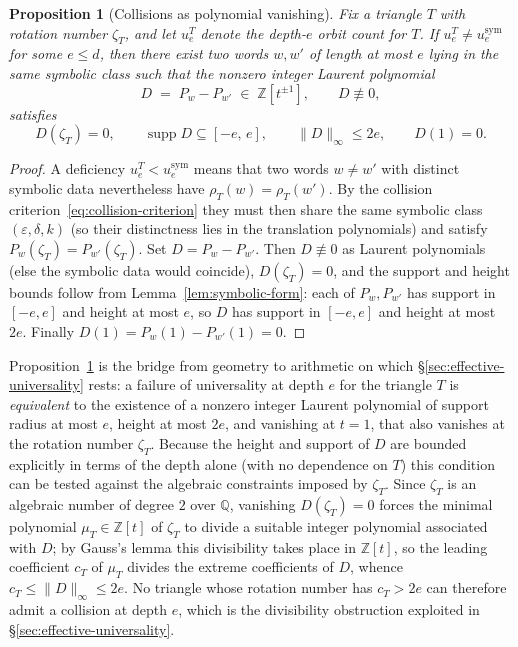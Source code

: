 \documentclass[11pt]{article}
\theoremstyle{plain}
\newtheorem{proposition}[theorem]{Proposition}
\theoremstyle{definition}
\theoremstyle{remark}
\begin{document}
\begin{proposition}[Collisions as polynomial vanishing]
\label{prop:collision-vanishing}
Fix a triangle $T$ with rotation number $\zeta_T$, and let
$u_e^T$ denote the depth-$e$ orbit count for $T$. If
$u_e^T \ne u_e^{\mathrm{sym}}$ for some $e \le d$, then there exist two
words $w, w'$ of length at most $e$ lying in the same symbolic class such
that the nonzero integer Laurent polynomial
\[
D \;=\; P_w - P_{w'} \;\in\; \mathbb{Z}[t^{\pm 1}],
\qquad D \not\equiv 0,
\]
satisfies
\begin{equation}
\label{eq:collision-vanishing-form}
D(\zeta_T) = 0,
\qquad
\operatorname{supp} D \subseteq [-e,\,e],
\qquad
\|D\|_\infty \le 2e,
\qquad
D(1) = 0.
\end{equation}
\end{proposition}

\begin{proof}
A deficiency $u_e^T < u_e^{\mathrm{sym}}$ means that two words $w \ne w'$
with distinct symbolic data nevertheless have $\rho_T(w) = \rho_T(w')$.
By the collision criterion~\eqref{eq:collision-criterion} they must then
share the same symbolic class $(\varepsilon, \delta, k)$ (so their
distinctness lies in the translation polynomials) and satisfy
$P_w(\zeta_T) = P_{w'}(\zeta_T)$. Set $D = P_w - P_{w'}$. Then
$D \not\equiv 0$ as Laurent polynomials (else the symbolic data would
coincide), $D(\zeta_T) = 0$, and the support and height bounds follow from
Lemma~\ref{lem:symbolic-form}: each of $P_w, P_{w'}$ has support in
$[-e, e]$ and height at most $e$, so $D$ has support in $[-e, e]$ and
height at most $2e$. Finally $D(1) = P_w(1) - P_{w'}(1) = 0$.
\end{proof}

Proposition~\ref{prop:collision-vanishing} is the bridge from geometry to
arithmetic on which \S\ref{sec:effective-universality} rests: a failure of
universality at depth $e$ for the triangle $T$ is \emph{equivalent} to the
existence of a nonzero integer Laurent polynomial of support radius at most
$e$, height at most $2e$, and vanishing at $t = 1$, that also vanishes at
the rotation number $\zeta_T$. Because the height and support of $D$ are
bounded explicitly in terms of the depth alone (with no dependence on
$T$) this condition can be tested against the algebraic constraints
imposed by $\zeta_T$. Since $\zeta_T$ is an algebraic number of degree $2$
over $\mathbb{Q}$, vanishing $D(\zeta_T) = 0$ forces the minimal polynomial
$\mu_T \in \mathbb{Z}[t]$ of $\zeta_T$ to divide a suitable integer
polynomial associated with $D$; by Gauss's lemma this divisibility takes
place in $\mathbb{Z}[t]$, so the leading coefficient $c_T$ of $\mu_T$
divides the extreme coefficients of $D$, whence $c_T \le \|D\|_\infty \le
2e$. No triangle whose rotation number has $c_T > 2e$ can therefore admit
a collision at depth $e$, which is the divisibility obstruction exploited
in \S\ref{sec:effective-universality}.
\end{document}
